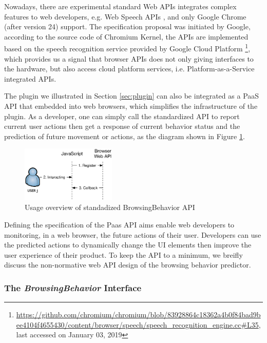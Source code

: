 Nowadays, there are experimental standard Web APIs integrates complex features to 
web developers, e.g. Web Speech APIs \cite{mozilla2019speech}, and 
only Google Chrome (after version 24) support. 
The specification proposal was initiated by Google, according to 
the source code of Chromium Kernel, the APIs are implemented based on 
the speech recognition service provided 
by Google Cloud Platform 
\footnote{\url{https://github.com/chromium/chromium/blob/83928864c18362a4b0f84bad9bee4104f4655430/content/browser/speech/speech\_recognition\_engine.cc\#L35}, last accessed on January 03, 2019},
which provides us a signal that browser APIs does not only giving interfaces to
the hardware, but also access cloud platform services, i.e. Platform-as-a-Service integrated 
APIs.

The plugin we illustrated in Section \ref{sec:plugin} can also be integrated as a PaaS API
that embedded into web browsers, which simplifies the infrastructure of the plugin. 
As a developer, one can simply call the standardized API to report current user actions
then get a response of current behavior status and the prediction of future movement or 
actions, as the diagram shown in Figure \ref{fig:webapi}.

\begin{figure}[H]
    \centering
    \includegraphics[width=0.4\textwidth]{figures/webapi}
    \caption{Usage overview of standadized BrowsingBehavior API}
    \label{fig:webapi}
\end{figure}

Defining the specification of the Paas API aims enable web developers to
monitoring, in a web browser, the future actions of their user.
Developers can use the predicted actions to dynamically change the UI elements then improve
the user experience of their product. To keep the API to a minimum, we breifly discuss the
non-normative web API design of the browsing behavior predictor.

\subsubsection{The \emph{BrowsingBehavior} Interface}

